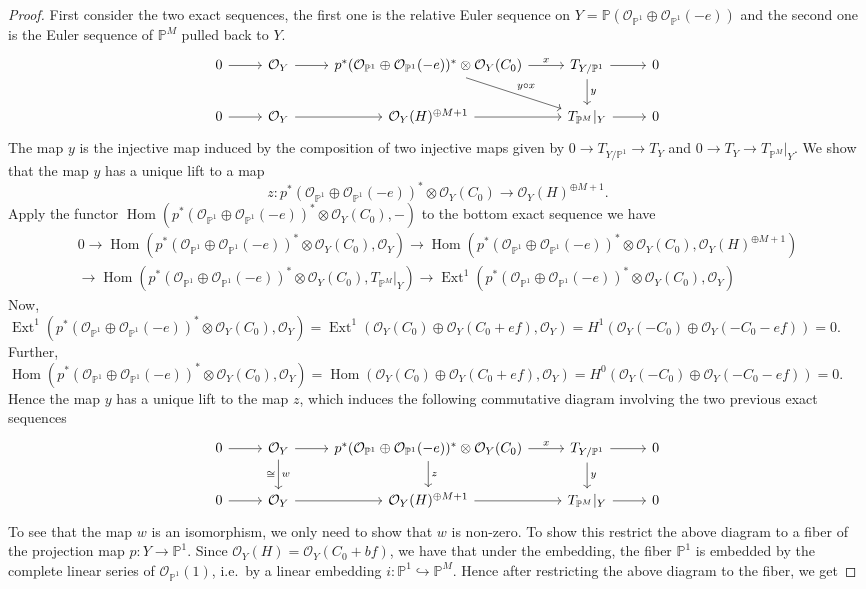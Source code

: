 \documentclass[11pt,twoside]{amsart}
\theoremstyle{plain}
\theoremstyle{definition}
\newcommand{\PP}{\mathbb{P}}
\newcommand{\PM}{\mathbb{P}^M}
\newcommand{\OO}{\mathcal{O}}
\newcommand{\Hom}{\operatorname{Hom}}
\newcommand{\Ext}{\operatorname{Ext}}
\newcommand{\TP}{T_{\PM}|_Y}
\begin{document}
\begin{proof}
First consider the two exact sequences, the first one is the relative Euler sequence on $Y=\PP(\OO_{\PP^1}\oplus\OO_{\PP^1}(-e))$ and the second one is the Euler sequence of $\PM$ pulled back to $Y$.
\[
\begin{tikzcd}
  0 \arrow[r] & \OO_Y \arrow[r] & p^*(\OO_{\PP^1} \oplus \OO_{\PP^1}(-e))^* \otimes \OO_{Y}(C_0) \arrow[r, "x"] \arrow[dr, "y \circ x"] & T_{Y/\PP^1} \arrow[r] \arrow[d, "y"] & 0 \\
   0 \arrow[r] & \OO_Y \arrow[r] & \OO_Y(H)^{\oplus M+1} \arrow[r] & \TP \arrow[r] & 0
\end{tikzcd}
\]
The map $y$ is the injective map induced by the composition of two injective maps given by $0\to T_{Y/\PP^1}\to T_Y$ and $0\to T_Y\to\TP$. We show that the map $y$ has a unique lift to a map
\[
z\colon p^*(\OO_{\PP^1}\oplus\OO_{\PP^1}(-e))^*\otimes\OO_Y(C_0)\to\OO_Y(H)^{\oplus M+1} .
\]
Apply the functor $\Hom(p^*(\OO_{\PP^1}\oplus\OO_{\PP^1}(-e))^*\otimes\OO_Y(C_0),-)$ to the bottom exact sequence we have
\begin{multline*}
0\to\Hom(p^*(\OO_{\PP^1}\oplus\OO_{\PP^1}(-e))^*\otimes\OO_Y(C_0),\OO_Y)\to\Hom(p^*(\OO_{\PP^1}\oplus\OO_{\PP^1}(-e))^*\otimes\OO_Y(C_0),\OO_Y(H)^{\oplus M+1})\\
\to\Hom(p^*(\OO_{\PP^1}\oplus\OO_{\PP^1}(-e))^*\otimes\OO_Y(C_0),\TP)\to\Ext^1(p^*(\OO_{\PP^1}\oplus\OO_{\PP^1}(-e))^*\otimes\OO_Y(C_0),\OO_Y)
\end{multline*}
Now, $\Ext^1(p^*(\OO_{\PP^1}\oplus\OO_{\PP^1}(-e))^*\otimes\OO_Y(C_0),\OO_Y)=\Ext^1(\OO_Y(C_0)\oplus\OO_Y(C_0+ef),\OO_Y)=H^1(\OO_Y(-C_0)\oplus\OO_Y(-C_0-ef))=0$. Further, $\Hom(p^*(\OO_{\PP^1}\oplus\OO_{\PP^1}(-e))^*\otimes\OO_Y(C_0),\OO_Y)=\Hom(\OO_Y(C_0)\oplus\OO_Y(C_0+ef),\OO_Y)=H^0(\OO_Y(-C_0)\oplus\OO_Y(-C_0-ef))=0$. Hence the map $y$ has a unique lift to the map $z$, which induces the following commutative diagram involving the two previous exact sequences
\begin{equation}\label{diag:relEuler}
\begin{tikzcd}
  0 \arrow[r] & \OO_Y \arrow[r] \arrow[d, "w", "\cong"'] & p^*(\OO_{\PP^1} \oplus \OO_{\PP^1}(-e))^* \otimes \OO_Y(C_0) \arrow[r, "x"] \arrow[d, "z"] & T_{Y/\PP^1} \arrow[r] \arrow[d, "y"] & 0 \\
   0 \arrow[r] & \OO_Y \arrow[r] & \OO_Y(H)^{\oplus M+1} \arrow[r] & \TP \arrow[r] & 0
\end{tikzcd}
\end{equation}
To see that the map $w$ is an isomorphism, we only need to show that $w$ is non-zero. To show this restrict the above diagram to a fiber of the projection map $p\colon Y\to\PP^1$. Since $\OO_Y(H)=\OO_Y(C_0+bf)$, we have that under the embedding, the fiber $\PP^1$ is embedded by the complete linear series of $\OO_{\PP^1}(1)$, i.e.\ by a linear embedding $i\colon\PP^1\hookrightarrow\PM$. Hence after restricting the above diagram to the fiber, we get

\end{proof}
\end{document}
